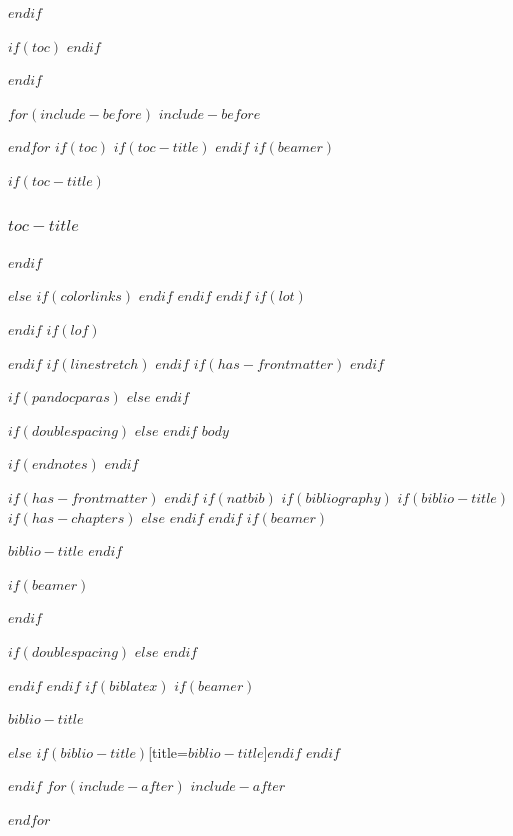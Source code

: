 \documentclass[
$if(fontsize)$
  $fontsize$,
$endif$
$if(lang)$
  $babel-lang$,
$endif$
$if(papersize)$
  $papersize$paper,
$endif$
$if(beamer)$
  ignorenonframetext,
$if(handout)$
  handout,
$endif$
$if(aspectratio)$
  aspectratio=$aspectratio$,
$endif$
$endif$
$for(classoption)$
  $classoption$$sep$,
$endfor$
]{$documentclass$}
\newif\ifbibliography
\begin{document}
$endif$

\vskip 8.5pt

$if(toc)$
{
\hypersetup{linkcolor=black}
\setcounter{tocdepth}{$toc-depth$}
\tableofcontents
}
$endif$

$endif$ %

$for(include-before)$
$include-before$

$endfor$
$if(toc)$
$if(toc-title)$
\renewcommand*\contentsname{$toc-title$}
$endif$
$if(beamer)$
\begin{frame}[allowframebreaks]
$if(toc-title)$
  \frametitle{$toc-title$}
$endif$
  \tableofcontents[hideallsubsections]
\end{frame}
$else$
{
$if(colorlinks)$
\hypersetup{linkcolor=$if(toccolor)$$toccolor$$else$$endif$}
$endif$
\setcounter{tocdepth}{$toc-depth$}
\tableofcontents
}
$endif$
$endif$
$if(lot)$
\listoftables
$endif$
$if(lof)$
\listoffigures
$endif$
$if(linestretch)$
$endif$
$if(has-frontmatter)$
\mainmatter
$endif$

$if(pandocparas)$
$else$
\setlength{\parindent}{16pt}
\setlength{\parskip}{0pt}
$endif$

$if(doublespacing)$
\doublespacing
$else$
$endif$
$body$

$if(endnotes)$
\newpage
\theendnotes
$endif$

$if(has-frontmatter)$
\backmatter
$endif$
$if(natbib)$
$if(bibliography)$
$if(biblio-title)$
$if(has-chapters)$
\renewcommand\bibname{$biblio-title$}
$else$
\renewcommand\refname{$biblio-title$}
$endif$
$endif$
$if(beamer)$
\begin{frame}[allowframebreaks]{$biblio-title$}
  \bibliographytrue
$endif$
  
$if(beamer)$
\end{frame}
$endif$


$if(doublespacing)$
\singlespacing
$else$
$endif$

$endif$
$endif$
$if(biblatex)$
$if(beamer)$
\begin{frame}[allowframebreaks]{$biblio-title$}
  \bibliographytrue
  \printbibliography[heading=none]
\end{frame}
$else$
\printbibliography$if(biblio-title)$[title=$biblio-title$]$endif$
$endif$

$endif$
$for(include-after)$
$include-after$

$endfor$
\end{document}
